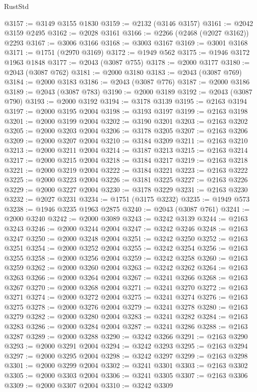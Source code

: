 \begin{lexlean}{RustStd}
\begin{coremodule}
@3157 := @3149 @3155 @1830
@3159 := @2132 (@3146 @3157)
@3161 := @2042 @3159 @2495
@3162 := @2028 @3161
@3166 := @2266 (@2468 (@2027 @3162)) @2293
@3167 := @3006 @3166
@3168 := @3003 @3167
@3169 := @3001 @3168
@3171 := @1751 (@2970 @3169)
@3172 := @1949 @562
@3175 := @1946 @3172 @1963 @1848
@3177 := @2043 (@3087 @755)
@3178 := @2000 @3177
@3180 := @2043 (@3087 @762)
@3181 := @2000 @3180
@3183 := @2043 (@3087 @769)
@3184 := @2000 @3183
@3186 := @2043 (@3087 @776)
@3187 := @2000 @3186
@3189 := @2043 (@3087 @783)
@3190 := @2000 @3189
@3192 := @2043 (@3087 @790)
@3193 := @2000 @3192
@3194 := @3178 @3139
@3195 := @2163 @3194
@3197 := @2000 @3195 @2004
@3198 := @3193 @3197
@3199 := @2163 @3198
@3201 := @2000 @3199 @2004
@3202 := @3190 @3201
@3203 := @2163 @3202
@3205 := @2000 @3203 @2004
@3206 := @3178 @3205
@3207 := @2163 @3206
@3209 := @2000 @3207 @2004
@3210 := @3184 @3209
@3211 := @2163 @3210
@3213 := @2000 @3211 @2004
@3214 := @3187 @3213
@3215 := @2163 @3214
@3217 := @2000 @3215 @2004
@3218 := @3184 @3217
@3219 := @2163 @3218
@3221 := @2000 @3219 @2004
@3222 := @3184 @3221
@3223 := @2163 @3222
@3225 := @2000 @3223 @2004
@3226 := @3181 @3225
@3227 := @2163 @3226
@3229 := @2000 @3227 @2004
@3230 := @3178 @3229
@3231 := @2163 @3230
@3232 := @2027 @3231
@3234 := @1751 (@3175 @3232)
@3235 := @1949 @573
@3238 := @1946 @3235 @1963 @2875
@3240 := @2043 (@3087 @761)
@3241 := @2000 @3240
@3242 := @2000 @3089
@3243 := @3242 @3139
@3244 := @2163 @3243
@3246 := @2000 @3244 @2004
@3247 := @3242 @3246
@3248 := @2163 @3247
@3250 := @2000 @3248 @2004
@3251 := @3242 @3250
@3252 := @2163 @3251
@3254 := @2000 @3252 @2004
@3255 := @3242 @3254
@3256 := @2163 @3255
@3258 := @2000 @3256 @2004
@3259 := @3242 @3258
@3260 := @2163 @3259
@3262 := @2000 @3260 @2004
@3263 := @3242 @3262
@3264 := @2163 @3263
@3266 := @2000 @3264 @2004
@3267 := @3241 @3266
@3268 := @2163 @3267
@3270 := @2000 @3268 @2004
@3271 := @3241 @3270
@3272 := @2163 @3271
@3274 := @2000 @3272 @2004
@3275 := @3241 @3274
@3276 := @2163 @3275
@3278 := @2000 @3276 @2004
@3279 := @3241 @3278
@3280 := @2163 @3279
@3282 := @2000 @3280 @2004
@3283 := @3241 @3282
@3284 := @2163 @3283
@3286 := @2000 @3284 @2004
@3287 := @3241 @3286
@3288 := @2163 @3287
@3289 := @2000 @3288
@3290 := @3242 @3266
@3291 := @2163 @3290
@3293 := @2000 @3291 @2004
@3294 := @3242 @3293
@3295 := @2163 @3294
@3297 := @2000 @3295 @2004
@3298 := @3242 @3297
@3299 := @2163 @3298
@3301 := @2000 @3299 @2004
@3302 := @3241 @3301
@3303 := @2163 @3302
@3305 := @2000 @3303 @2004
@3306 := @3241 @3305
@3307 := @2163 @3306
@3309 := @2000 @3307 @2004
@3310 := @3242 @3309

\end{coremodule}
\end{lexlean}

